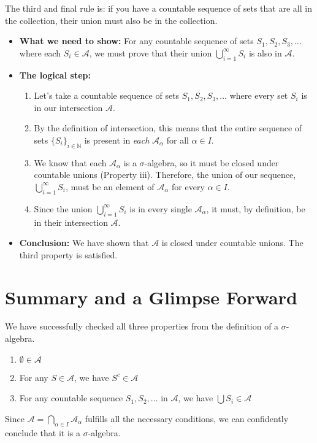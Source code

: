 \documentclass[11pt,a4paper]{article}
\theoremstyle{tutorstyle}
\begin{document}
The third and final rule is: if you have a countable sequence of sets that are all in the collection, their union must also be in the collection.

\begin{itemize}
    \item \textbf{What we need to show:} For any countable sequence of sets $S_1, S_2, S_3, \dots$ where each $S_i \in \mathcal{A}$, we must prove that their union $\bigcup_{i=1}^{\infty} S_i$ is also in $\mathcal{A}$.

    \item \textbf{The logical step:}
        \begin{enumerate}
            \item Let's take a countable sequence of sets $S_1, S_2, S_3, \dots$ where every set $S_i$ is in our intersection $\mathcal{A}$.
            \item By the definition of intersection, this means that the entire sequence of sets $\{S_i\}_{i \in \mathbb{N}}$ is present in \emph{each} $\mathcal{A}_\alpha$ for all $\alpha \in I$.
            \item We know that each $\mathcal{A}_\alpha$ is a $\sigma$-algebra, so it must be closed under countable unions (Property iii). Therefore, the union of our sequence, $\bigcup_{i=1}^{\infty} S_i$, must be an element of $\mathcal{A}_\alpha$ for every $\alpha \in I$.
            \item Since the union $\bigcup_{i=1}^{\infty} S_i$ is in every single $\mathcal{A}_\alpha$, it must, by definition, be in their intersection $\mathcal{A}$.
        \end{enumerate}

    \item \textbf{Conclusion:} We have shown that $\mathcal{A}$ is closed under countable unions. The third property is satisfied.
\end{itemize}

\section{Summary and a Glimpse Forward}

We have successfully checked all three properties from the definition of a $\sigma$-algebra.
\begin{enumerate}
    \item[\checkmark] $\emptyset \in \mathcal{A}$
    \item[\checkmark] For any $S \in \mathcal{A}$, we have $S^c \in \mathcal{A}$
    \item[\checkmark] For any countable sequence $S_1, S_2, \dots$ in $\mathcal{A}$, we have $\bigcup S_i \in \mathcal{A}$
\end{enumerate}
Since $\mathcal{A} = \bigcap_{\alpha \in I} \mathcal{A}_\alpha$ fulfills all the necessary conditions, we can confidently conclude that it is a $\sigma$-algebra.
\end{document}
